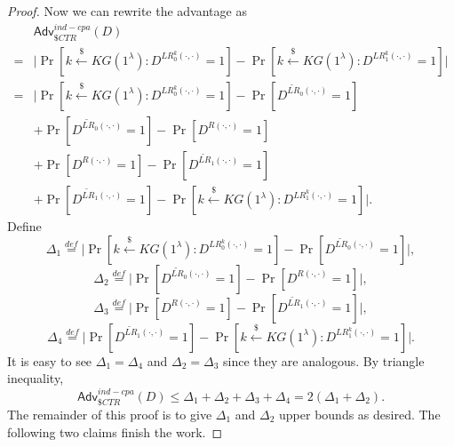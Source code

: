 \documentclass[12pt]{article}
\newcommand{\eqdef}{\stackrel{def}{=}}
\newcommand{\getsr}{\stackrel{\$}{\gets}}
\newcommand{\Adv}{\mathsf{Adv}}
\theoremstyle{definition}
\begin{document}
\begin{proof}
Now we can rewrite the advantage as
$$\begin{aligned}
& \Adv_{\$CTR}^{ind-cpa}(D) \\
= & \bigg| \Pr[k \getsr KG(1^\lambda) : D^{LR_0^k(\cdot,\cdot)}=1] - \Pr[k \getsr KG(1^\lambda) : D^{LR_1^k(\cdot,\cdot)}=1] \bigg| \\
= & \bigg| \Pr[k \getsr KG(1^\lambda) : D^{LR_0^k(\cdot,\cdot)}=1] - \Pr[D^{\widetilde{LR}_0(\cdot,\cdot)}=1] \\
&+\Pr[D^{\widetilde{LR}_0(\cdot,\cdot)}=1] - \Pr[D^{R(\cdot,\cdot)}=1] \\
&+\Pr[D^{R(\cdot,\cdot)}=1] - \Pr[D^{\widetilde{LR}_1(\cdot,\cdot)}=1] \\
&+\Pr[D^{\widetilde{LR}_1(\cdot,\cdot)}=1] - \Pr[k \getsr KG(1^\lambda) : D^{LR_1^k(\cdot,\cdot)}=1] \bigg|.
\end{aligned}$$
Define
$$\Delta_1 \eqdef \bigg| \Pr[k \getsr KG(1^\lambda) : D^{LR_0^k(\cdot,\cdot)}=1] - \Pr[D^{\widetilde{LR}_0(\cdot,\cdot)}=1] \bigg|,$$
$$\Delta_2 \eqdef \bigg| \Pr[D^{\widetilde{LR}_0(\cdot,\cdot)}=1] - \Pr[D^{R(\cdot,\cdot)}=1] \bigg|,$$
$$\Delta_3 \eqdef \bigg| \Pr[D^{R(\cdot,\cdot)}=1] - \Pr[D^{\widetilde{LR}_1(\cdot,\cdot)}=1] \bigg|,$$
$$\Delta_4 \eqdef \bigg| \Pr[D^{\widetilde{LR}_1(\cdot,\cdot)}=1] - \Pr[k \getsr KG(1^\lambda) : D^{LR_1^k(\cdot,\cdot)}=1] \bigg|.$$
It is easy to see $\Delta_1 = \Delta_4$ and $\Delta_2 = \Delta_3$ since they are analogous.
By triangle inequality, 
$$\Adv_{\$CTR}^{ind-cpa}(D) \leq \Delta_1 + \Delta_2 + \Delta_3 + \Delta_4 = 2(\Delta_1 + \Delta_2).$$
The remainder of this proof is to give $\Delta_1$ and $\Delta_2$ upper bounds as desired. The following two claims finish the work.


\end{proof}
\end{document}
